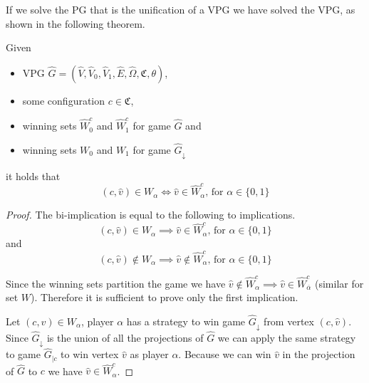 If we solve the PG that is the unification of a VPG we have solved the VPG, as shown in the following theorem.
\begin{theorem}
	\label{theA_solve_UVPG_is_solve_VPG}
	Given 
	\begin{itemize}
		\item VPG $\hat{G} =  (\hat{V},\hat{V}_0,\hat{V}_1, \hat{E},\hat{\Omega}, \mathfrak{C},\theta)$,
		\item some configuration $c \in \mathfrak{C}$,
		\item winning sets $\hat{W}^c_0$ and $\hat{W}^c_1$ for game $\hat{G}$ and
		\item winning sets $W_0$ and $W_1$ for game $\hat{G}_{\downarrow}$
	\end{itemize}
	it holds that
	\[(c,\hat{v}) \in W_\alpha \iff \hat{v} \in \hat{W}^c_\alpha  \text{, for }\alpha \in \{0,1\}  \]
	\begin{proof}
		The bi-implication is equal to  the following to implications.
		\[ (c,\hat{v}) \in W_\alpha \implies \hat{v} \in \hat{W}^c_\alpha  \text{, for }\alpha \in \{0,1\} \]
		and
		\[ (c,\hat{v}) \notin W_\alpha\implies \hat{v} \notin \hat{W}^c_\alpha \text{, for }\alpha \in \{0,1\}  \]
		
		Since the winning sets partition the game we have $\hat{v} \notin \hat{W}^c_\alpha \implies \hat{v} \in \hat{W}^c_{\overline{\alpha}}$ (similar for set $W$). Therefore it is sufficient to prove only the first implication.
		
		Let $(c,\hat{v}) \in W_\alpha$, player $\alpha$ has a strategy to win game $\hat{G}_{\downarrow}$ from vertex $(c,\hat{v})$. Since $\hat{G}_{\downarrow}$ is the union of all the projections of $\hat{G}$ we can apply the same strategy to game $\hat{G}_{|c}$ to win vertex $\hat{v}$ as player $\alpha$. Because we can win $\hat{v}$ in the projection of $\hat{G}$ to $c$ we have $\hat{v} \in \hat{W}^c_\alpha$.
	\end{proof}
\end{theorem}

